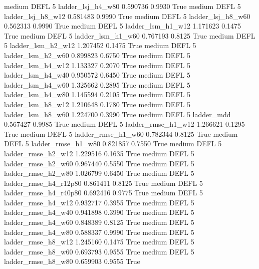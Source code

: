     medium     DEFL                 5      ladder_lsj_h4_w80   0.590736      0.9930    True
    medium     DEFL                 5      ladder_lsj_h8_w12   0.581483      0.9990    True
    medium     DEFL                 5      ladder_lsj_h8_w60   0.562313      0.9990    True
    medium     DEFL                 5      ladder_lsm_h1_w12   1.171623      0.1475    True
    medium     DEFL                 5      ladder_lsm_h1_w60   0.767193      0.8125    True
    medium     DEFL                 5      ladder_lsm_h2_w12   1.207452      0.1475    True
    medium     DEFL                 5      ladder_lsm_h2_w60   0.899823      0.6750    True
    medium     DEFL                 5      ladder_lsm_h4_w12   1.133327      0.2070    True
    medium     DEFL                 5      ladder_lsm_h4_w40   0.950572      0.6450    True
    medium     DEFL                 5      ladder_lsm_h4_w60   1.325662      0.2895    True
    medium     DEFL                 5      ladder_lsm_h4_w80   1.145594      0.2105    True
    medium     DEFL                 5      ladder_lsm_h8_w12   1.210648      0.1780    True
    medium     DEFL                 5      ladder_lsm_h8_w60   1.224700      0.3990    True
    medium     DEFL                 5             ladder_mdd   0.567427      0.9985    True
    medium     DEFL                 5     ladder_rmse_h1_w12   1.266621      0.1295    True
    medium     DEFL                 5     ladder_rmse_h1_w60   0.782344      0.8125    True
    medium     DEFL                 5     ladder_rmse_h1_w80   0.821857      0.7550    True
    medium     DEFL                 5     ladder_rmse_h2_w12   1.229516      0.1635    True
    medium     DEFL                 5     ladder_rmse_h2_w60   0.967440      0.5550    True
    medium     DEFL                 5     ladder_rmse_h2_w80   1.026799      0.6450    True
    medium     DEFL                 5  ladder_rmse_h4_r12p80   0.861411      0.8125    True
    medium     DEFL                 5  ladder_rmse_h4_r40p80   0.692416      0.9775    True
    medium     DEFL                 5     ladder_rmse_h4_w12   0.932717      0.3955    True
    medium     DEFL                 5     ladder_rmse_h4_w40   0.941898      0.3990    True
    medium     DEFL                 5     ladder_rmse_h4_w60   0.848389      0.8125    True
    medium     DEFL                 5     ladder_rmse_h4_w80   0.588337      0.9990    True
    medium     DEFL                 5     ladder_rmse_h8_w12   1.245160      0.1475    True
    medium     DEFL                 5     ladder_rmse_h8_w60   0.693793      0.9555    True
    medium     DEFL                 5     ladder_rmse_h8_w80   0.659903      0.9555    True
